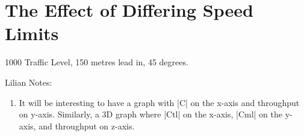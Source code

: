 \section{The Effect of Differing Speed Limits}
\label{sec:The Effect of Differing Speed Limits}
1000 Traffic Level, 150 metres lead in, 45 degrees.

Lilian Notes:
\begin{enumerate}
\item It will be interesting to have a graph with |C| on the x-axis and throughput on y-axis. Similarly, a 3D graph where  |Ctl| on the x-axis, |Cml| on the y-axis, and throughput on z-axis.
\end{enumerate}

